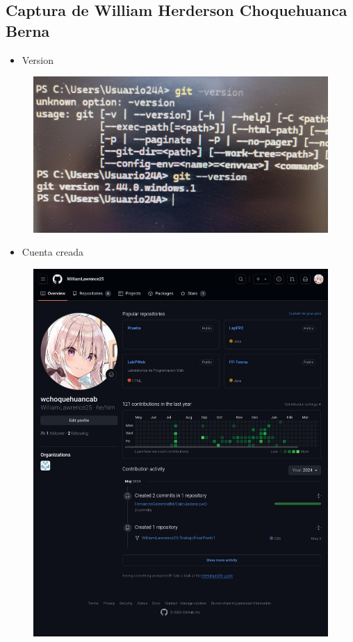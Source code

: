 \documentclass{article}
\begin{document}
	\subsection{Captura de William Herderson Choquehuanca Berna}
	\begin{itemize}
		\item Version
	\end{itemize}
	\begin{figure}[H]
		\centering
		\includegraphics[width=1.0\textwidth,keepaspectratio]{img/WilliamVersion.jpg}
	\end{figure}
	\begin{itemize}
		\item Cuenta creada
	\end{itemize}
	\begin{figure}[H]
		\centering
		\includegraphics[width=1.0\textwidth,keepaspectratio]{img/WilliamCuenta.jpg}
	\end{figure}
	\clearpage
\end{document}
